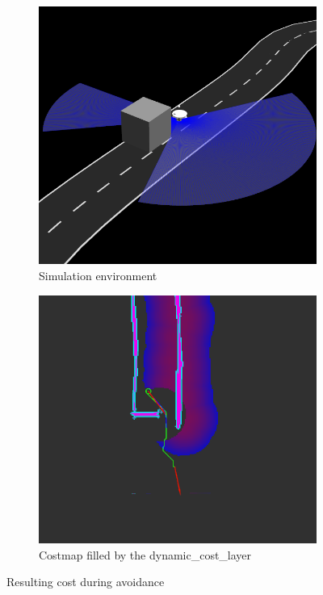 \begin{figure}[H]
	\centering
	\begin{subfigure}{.45\linewidth}
		\includegraphics[width=\textwidth]{Pictures/avoidance}
		\caption{Simulation environment}
		\end{subfigure}	
	\begin{subfigure}{.45\linewidth}
		\includegraphics[width=\textwidth]{Pictures/avoid cost}
		\caption{Costmap filled by the dynamic\_cost\_layer}
	\end{subfigure}
	\caption{Resulting cost during avoidance}
	\label{dyncost}
\end{figure}


